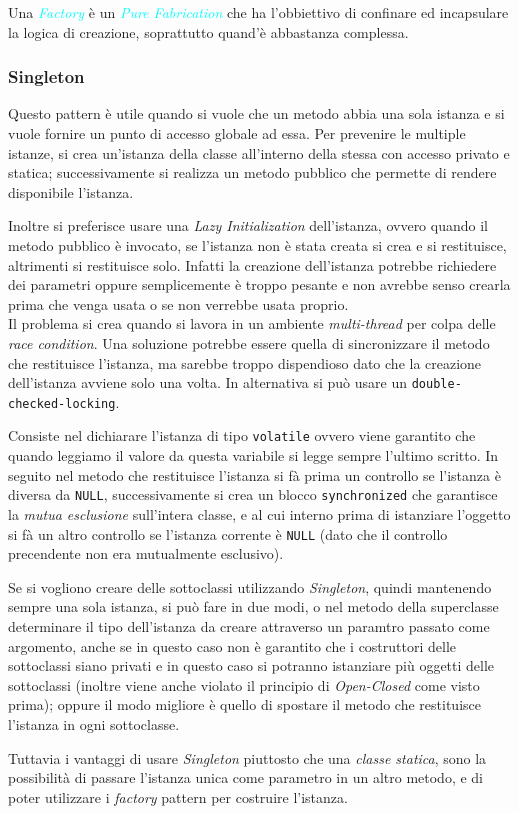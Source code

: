 Una \emph{\textcolor{cyan}{Factory}} è un \emph{\textcolor{cyan}{Pure Fabrication}} che ha l'obbiettivo di confinare ed incapsulare
la logica di creazione, soprattutto quand'è abbastanza complessa.

\subsubsection{Singleton}

Questo pattern è utile quando si vuole che un metodo abbia una sola istanza e si vuole
fornire un punto di accesso globale ad essa. Per prevenire le multiple istanze, si crea un'istanza
della classe all'interno della stessa con accesso privato e statica; successivamente si realizza un metodo
pubblico che permette di rendere disponibile l'istanza.

Inoltre si preferisce usare una \emph{Lazy Initialization} dell'istanza, ovvero quando il metodo
pubblico è invocato, se l'istanza non è stata creata si crea e si restituisce, altrimenti si restituisce solo.
Infatti la creazione dell'istanza potrebbe richiedere dei parametri oppure semplicemente è troppo pesante e non avrebbe senso
crearla prima che venga usata o se non verrebbe usata proprio. \\

Il problema si crea quando si lavora in un ambiente \emph{multi-thread}
per colpa delle \emph{race condition}. Una soluzione potrebbe essere quella di sincronizzare
il metodo che restituisce l'istanza, ma sarebbe troppo dispendioso dato che la creazione
dell'istanza avviene solo una volta. In alternativa si può usare un \verb|double-checked-locking|.

Consiste nel dichiarare l'istanza di tipo \verb|volatile| ovvero viene garantito che quando leggiamo il valore
da questa variabile si legge sempre l'ultimo scritto. In seguito nel metodo che restituisce
l'istanza si fà prima un controllo se l'istanza è diversa da \verb|NULL|, successivamente si crea un blocco
\verb|synchronized| che garantisce la \emph{mutua esclusione} sull'intera classe, e al cui interno prima di istanziare
l'oggetto si fà un altro controllo se l'istanza corrente è \verb|NULL| (dato che il controllo precendente non era mutualmente esclusivo).

Se si vogliono creare delle sottoclassi utilizzando \emph{Singleton}, quindi mantenendo sempre una sola istanza, si può fare
in due modi, o nel metodo della superclasse determinare il tipo dell'istanza da creare attraverso un paramtro passato come argomento, anche se in questo
caso non è garantito che i costruttori delle sottoclassi siano privati e in questo caso si potranno istanziare più oggetti delle sottoclassi (inoltre viene anche violato il principio di \emph{Open-Closed} come visto prima);
oppure il modo migliore è quello di spostare il metodo che restituisce l'istanza in ogni sottoclasse.

Tuttavia i vantaggi di usare \emph{Singleton} piuttosto che una \emph{classe statica}, sono
la possibilità di passare l'istanza unica come parametro in un altro metodo, e di poter utilizzare
i \emph{factory} pattern per costruire l'istanza.